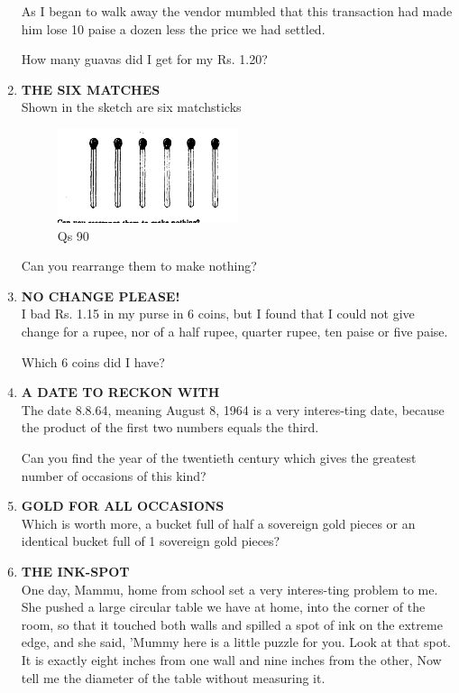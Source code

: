 \documentclass[12pt]{article}
\begin{document}
\begin{enumerate}
As I began  to walk  away  the vendor  mumbled  that this transaction  had made  him lose  10 paise  a dozen  less the price  we had settled. 

How  many  guavas  did I get for my Rs. 1.20? 
%
\item \textbf{THE  SIX  MATCHES} \\
Shown  in the sketch  are six matchsticks 

\begin{figure}[h]
\begin{center}
\includegraphics[width=0.5\textwidth]{images/sdevi_q90.png}
\caption{ Qs 90}
\end{center}
\end{figure}

Can you  rearrange  them  to make  nothing? 
%
\item \textbf{NO CHANGE  PLEASE!} \\
I bad Rs. 1.15  in my purse  in 6 coins,  but I found  that  I could  not  give  change  for a rupee,  nor of a half  rupee, quarter  rupee,  ten paise  or five paise. 

Which  6 coins  did I have? 
%
\item \textbf{A  DATE  TO RECKON  WITH} \\
The date  8.8.64,  meaning  August  8, 1964  is a very  interes-ting date,  because  the  product  of the first  two numbers equals  the third. 

Can you find  the year  of the twentieth  century  which gives  the greatest  number  of occasions  of this kind? 
%
\item \textbf{GOLD  FOR  ALL  OCCASIONS} \\ 
Which is worth  more,  a bucket  full of half  a sovereign gold pieces  or an identical  bucket  full of 1 sovereign  gold pieces? 
%
\item \textbf{THE  INK-SPOT} \\
One day,  Mammu,  home  from  school  set a very  interes-ting problem  to me.  She  pushed  a large  circular  table we have  at home,  into  the corner  of the room,  so that  it touched  both  walls  and  spilled  a spot  of ink  on the extreme  edge,  and she said,  'Mummy  here  is a little  puzzle for you.  Look  at that  spot.  It is exactly  eight  inches from  one wall  and nine  inches  from  the other,  Now  tell me the diameter  of the table  without  measuring  it.


\end{enumerate}
\end{document}
